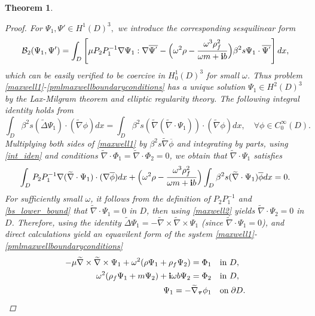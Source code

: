 \documentclass[11pt]{article}
\newcommand{\pa}{\partial}
\newcommand{\om}{\omega}
\newcommand{\wid}{\widetilde}
\newcommand{\bs}{\boldsymbol}
\newtheorem{theorem}{Theorem}[section]
\begin{document}
\begin{theorem}
\begin{proof}
For $\Psi_1,\Psi'\in H^1(D)^3,$ we introduce the corresponding sesquilinear form
\begin{equation*}
\mathcal{B}_{2}(\Psi_1,\Psi')=\int_{D}\left[\mu P_2P_1^{-1}\nabla\Psi_1:\nabla\overline{\Psi^{'}} 
- \Big(\omega^2\rho -\frac{\omega^3\rho_f^2}{\omega m+{\bf i}b}\Big)\beta^2s\Psi_1\cdot \overline{\Psi^{'}}\right]dx,
\end{equation*} 
which can be easily verified to be coercive in $H_0^1(D)^3$ for small $\om$. Thus problem
\eqref{maxwell1}-\eqref{pmlmaxwellboundaryconditions} has a unique solution $\Psi_1\in H^2(D)^3$ 
by the Lax-Milgram theorem and elliptic regularity theory.  The following integral identity holds 
from \cite[equation (3.5)]{BPT2010}
\begin{equation}\label{int_iden}
\int_{D}\beta^2s(\wid{\Delta}\Psi_1)\cdot(\wid{\nabla}\phi)dx=\int_{D}\beta^2s(\wid{\nabla}
(\wid{\nabla}\cdot\Psi_1 ))\cdot(\wid{\nabla}\phi)dx, \quad \forall \phi\in C_0^{\infty}(D).
\end{equation}
Multiplying both sides of \eqref{maxwell1} by $\beta^2s\wid{\nabla}\overline{\phi}$ and integrating 
by parts, using \eqref{int_iden} and conditions $\wid{\nabla}\cdot \Phi_1=\wid{\nabla}\cdot \Phi_2=0$, 
we obtain that $\wid{\nabla}\cdot \Psi_1$ satisfies
\begin{equation}
\int_{D}P_2P_1^{-1}\nabla(\wid{\nabla}\cdot\Psi_1 )\cdot(\nabla\overline{\phi})dx+\Big(\omega^2\rho 
-\frac{\omega^3\rho_f^2}{\omega m+{\bf i}b}\Big)\int_{D}\beta^2s(\wid{\nabla}\cdot\Psi_1)\overline{\phi}dx=0.
\end{equation}
For sufficiently small $\omega$, it follows from the definition of $P_2P_1^{-1}$ and 
\eqref{bs_lower_bound} that $\wid{\nabla}\cdot \Psi_1=0$ in $D$, then using \eqref{maxwell2} 
yields $\wid{\nabla}\cdot \Psi_2=0$ in $D$.
Therefore, using the identity $\wid{\Delta}\Psi_1=-\wid{\nabla}\times\wid{\nabla}\times\Psi_1$ 
(since $\wid{\nabla}\cdot\Psi_1=0$), and direct calculations yield an equavilent form of the 
system \eqref{maxwell1}-\eqref{pmlmaxwellboundaryconditions}
\begin{align}\label{eq:Phi1}
-\mu\wid{\nabla}\times\wid{\nabla} \times \Psi_1+\omega^2(\rho\Psi_1 +\rho_f \Psi_2)
=\Phi_1 & \quad\text{in }  D,\\\label{eq:Phi2}
\omega^2(\rho_f \Psi_1+m \Psi_2)+{\bf i}\omega b \Psi_2=\Phi_2 & \quad\text{in }  D,\\ \label{eq:Phi_bc}
\Psi_1=-\wid{\nabla}_{\bs{\tau}}\phi_1 &\quad {\rm on}\;\pa D.
\end{align}

\end{proof}
\end{theorem}
\end{document}
